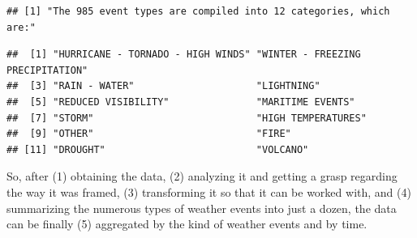 \documentclass[
]{article}
\newenvironment{Shaded}{\begin{snugshade}}{\end{snugshade}}
\newcommand{\CommentTok}[1]{\textcolor[rgb]{0.56,0.35,0.01}{\textit{#1}}}
\newcommand{\FunctionTok}[1]{\textcolor[rgb]{0.00,0.00,0.00}{#1}}
\newcommand{\NormalTok}[1]{#1}
\newcommand{\SpecialCharTok}[1]{\textcolor[rgb]{0.00,0.00,0.00}{#1}}
\newcommand{\StringTok}[1]{\textcolor[rgb]{0.31,0.60,0.02}{#1}}
\begin{document}
\begin{Shaded}
\end{Shaded}

\begin{verbatim}
## [1] "The 985 event types are compiled into 12 categories, which are:"
\end{verbatim}

\begin{Shaded}
\end{Shaded}

\begin{verbatim}
##  [1] "HURRICANE - TORNADO - HIGH WINDS" "WINTER - FREEZING PRECIPITATION" 
##  [3] "RAIN - WATER"                     "LIGHTNING"                       
##  [5] "REDUCED VISIBILITY"               "MARITIME EVENTS"                 
##  [7] "STORM"                            "HIGH TEMPERATURES"               
##  [9] "OTHER"                            "FIRE"                            
## [11] "DROUGHT"                          "VOLCANO"
\end{verbatim}

So, after (1) obtaining the data, (2) analyzing it and getting a grasp
regarding the way it was framed, (3) transforming it so that it can be
worked with, and (4) summarizing the numerous types of weather events
into just a dozen, the data can be finally (5) aggregated by the kind of
weather events and by time.
\end{document}

